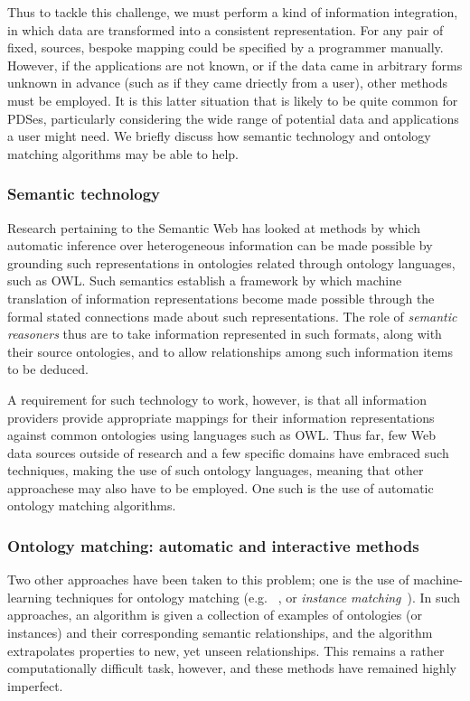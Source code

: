 \documentclass[graybox]{svmult}
\begin{document}
Thus to tackle this challenge, we must perform a kind of information integration, in which data are transformed into a consistent representation.  For any pair of fixed, sources, bespoke mapping could be specified by a programmer manually.  However, if the applications are not known, or if the data came in arbitrary forms unknown in advance (such as if they came driectly from a user), other methods must be employed.  It is this latter situation that is likely to be quite common for PDSes, particularly considering the wide range of potential data and applications a user might need.  We briefly discuss how semantic technology and ontology matching algorithms may be able to help.

\subsubsection{Semantic technology}

Research pertaining to the Semantic Web\emph{} has looked at methods by which automatic inference over heterogeneous information can be made possible by grounding such representations in ontologies related through ontology languages, such as OWL\cite{antoniou2004web}.  Such semantics establish a framework by which machine translation of information representations become made possible through the formal stated connections made about such representations.  The role of \emph{semantic reasoners} thus are to take information represented in such formats, along with their source ontologies, and to allow relationships among such information items to be deduced. 

A requirement for such technology to work, however, is that all information providers provide appropriate mappings for their information representations against common ontologies using languages such as OWL.  Thus far, few Web data sources outside of research and a few specific domains have embraced such techniques, making the use of such ontology languages, meaning that other approachese may also have to be employed. One such is the use of automatic ontology matching algorithms.

\subsubsection{Ontology matching: automatic and interactive methods}
Two other approaches have been taken to this problem; one is the use of machine-learning techniques for ontology matching (e.g. ~\cite{euzenat2004api,doan2003learning}, or \emph{instance matching}~\cite{suchanek2011paris,castano2006matching}).  In such approaches, an algorithm is given a collection of examples of ontologies (or instances) and their corresponding semantic relationships, and the algorithm extrapolates properties to new, yet unseen relationships.  This remains a rather computationally difficult task, however, and these methods have remained highly imperfect.
\end{document}

